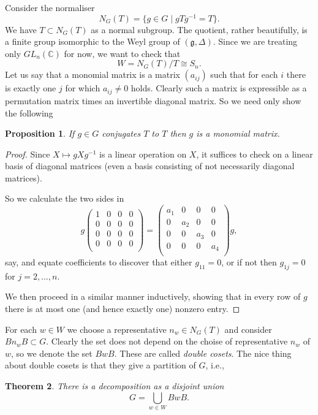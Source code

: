 \documentclass[12pt]{article}
\theoremstyle{plain}
\newtheorem{thm}{Theorem}[section]
\newtheorem{prop}[thm]{Proposition}
\theoremstyle{definition}
\numberwithin{equation}{section}
\newcommand{\D}{\Delta}
\newcommand{\C}{\mathbb{C}}
\newcommand{\g}{\mathfrak{g}}
\begin{document}
Consider the normaliser
\[
N_G(T) = \{g \in G \mid gTg^{-1} = T\}.
\]
We have $T \subset N_G(T)$ as a normal subgroup. The quotient, rather beautifully, is a finite group isomorphic to the Weyl group of $(\g, \D)$. Since we are treating only $GL_n(\C)$ for now, we want to check that
\[
W = N_G(T) / T \cong S_n.
\]
Let us say that a monomial matrix is a matrix $(a_{ij})$ such that for each $i$ there is exactly one $j$ for which $a_{ij} \neq 0$ holds. Clearly such a matrix is expressible as a permutation matrix times an invertible diagonal matrix. So we need only show the following
\begin{prop}
If $g \in G$ conjugates $T$ to $T$ then $g$ is a monomial matrix.
\end{prop}

\begin{proof}
Since $X \mapsto gXg^{-1}$ is a linear operation on $X$, it suffices to check on a linear basis of diagonal matrices (even a basis consisting of not necessarily diagonal matrices).

So we calculate the two sides in
\[
g \left(
\begin{array}{cccc}
1 & 0 & 0 & 0 \\
0 & 0 & 0 & 0 \\
0 & 0 & 0 & 0 \\
0 & 0 & 0 & 0 \\
\end{array}
\right) = \left(
\begin{array}{cccc}
a_1 & 0 & 0 & 0 \\
0 & a_2 & 0 & 0 \\
0 & 0 & a_3 & 0 \\
0 & 0 & 0 & a_4 \\
\end{array}
\right) g,
\]
say, and equate coefficients to discover that either $g_{11} = 0$, or if not then $g_{1j} = 0$ for $j = 2, \ldots, n$.

We then proceed in a similar manner inductively, showing that in every row of $g$ there is at most one (and hence exactly one) nonzero entry.
\end{proof}

For each $w \in W$ we choose a representative $n_w \in N_G(T)$ and consider $B n_w B \subset G$. Clearly the set does not depend on the choise of representative $n_w$ of $w$, so we denote the set $BwB$. These are called \emph{double cosets}. The nice thing about double cosets is that they give a partition of $G$, i.e.,
\begin{thm}
There is a decomposition as a disjoint union
\[
G = \bigcup_{w \in W} BwB.
\]
\end{thm}
\end{document}
